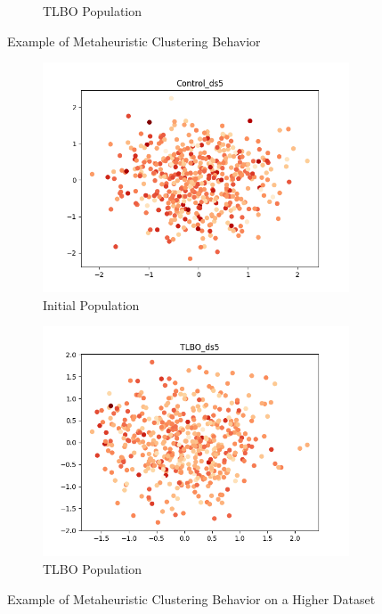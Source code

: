 \documentclass[11pt, letterpaper, onecolumn]{article}
\begin{document}
\begin{figure}[h!]
\begin{subfigure}[b]{0.4\linewidth}
    \caption{TLBO Population}
  \end{subfigure}
  \caption{Example of Metaheuristic Clustering Behavior}
  \label{fig:coffee}
\end{figure}

\begin{figure}[h!]
  \centering
  \begin{subfigure}[!h]{0.4\linewidth}
    \includegraphics[width=\linewidth]{graphs/Control_ds5__pca.png}
    \caption{Initial Population}
  \end{subfigure}
  \begin{subfigure}[!h]{0.4\linewidth}
    \includegraphics[width=\linewidth]{graphs/TLBO_ds5__pca.png}
    \caption{TLBO Population}
  \end{subfigure}
  \caption{Example of Metaheuristic Clustering Behavior on a Higher Dataset}
  \label{fig:coffee}
\end{figure}
\end{document}
